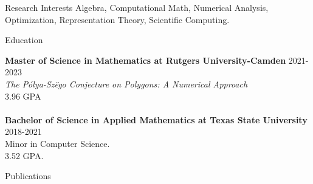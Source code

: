 \documentclass{resume} %
\begin{document}


\begin{rSection}{Research Interests}
Algebra, Computational Math, Numerical Analysis, Optimization, Representation Theory, Scientific Computing.


\end{rSection}

\begin{rSection}{Education}

{\bf Master of Science in Mathematics at Rutgers University-Camden} \hfill {2021-2023}
\\
\textit{The Pólya-Sz\"ego Conjecture on Polygons: A Numerical Approach}
\\
3.96 GPA
\\
\\
{\bf Bachelor of Science in Applied Mathematics at Texas State University} \hfill {2018-2021}
\\ 
Minor in Computer Science.
\\
3.52 GPA.

\end{rSection}

\begin{rSection}{Publications}
  \item {}
\end{rSection}



\end{document}
